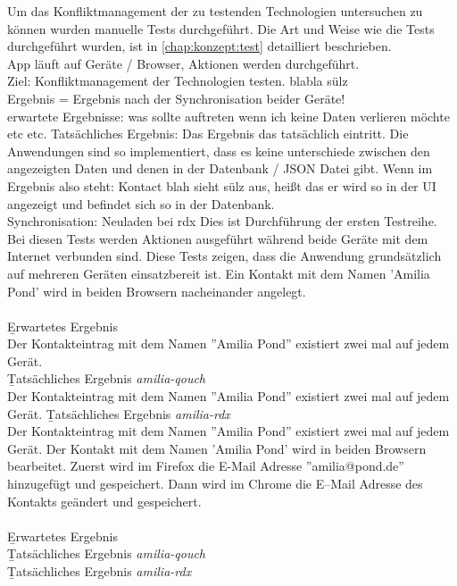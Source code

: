 Um das Konfliktmanagement der zu testenden Technologien untersuchen zu können wurden manuelle Tests durchgeführt.
Die Art und Weise wie die Tests durchgeführt wurden, ist in \autoref{chap:konzept:test} detailliert beschrieben.\\
App läuft auf Geräte / Browser, Aktionen werden durchgeführt.\\
Ziel: Konfliktmanagement der Technologien testen. blabla sülz\\
Ergebnis = Ergebnis nach der Synchronisation beider Geräte!\\ 
erwartete Ergebnisse: was sollte auftreten wenn ich keine Daten verlieren möchte etc etc.
Tatsächliches Ergebnis: Das Ergebnis das tatsächlich eintritt.
Die Anwendungen sind so implementiert, dass es keine unterschiede zwischen den angezeigten Daten und denen in der Datenbank / JSON Datei gibt.
Wenn im Ergebnis also steht: Kontact blah sieht sülz aus, heißt das er wird so in der UI angezeigt und befindet sich so in der Datenbank.\\
Synchronisation: Neuladen bei rdx
% 
% 
% 
Dies ist Durchführung der ersten Testreihe.
Bei diesen Tests werden Aktionen ausgeführt während beide Geräte mit dem Internet verbunden sind.
Diese Tests zeigen, dass die Anwendung grundsätzlich auf mehreren Geräten einsatzbereit ist.
%
Ein Kontakt mit dem Namen 'Amilia Pond' wird in beiden Browsern nacheinander angelegt.\\\\
\b{Erwartetes Ergebnis}\\
Der Kontakteintrag mit dem Namen ''Amilia Pond'' existiert zwei mal auf jedem Gerät.\\
\b{Tatsächliches Ergebnis \it{amilia-qouch}}\\
Der Kontakteintrag mit dem Namen ''Amilia Pond'' existiert zwei mal auf jedem Gerät.
\b{Tatsächliches Ergebnis \it{amilia-rdx}}\\
Der Kontakteintrag mit dem Namen ''Amilia Pond'' existiert zwei mal auf jedem Gerät.
%
Der Kontakt mit dem Namen 'Amilia Pond' wird in beiden Browsern bearbeitet. Zuerst wird im Firefox die E-Mail Adresse ''amilia@pond.de'' hinzugefügt und gespeichert.
Dann wird im Chrome die E--Mail Adresse des Kontakts geändert und gespeichert.\\\\
\b{Erwartetes Ergebnis}\\
\b{Tatsächliches Ergebnis \it{amilia-qouch}}\\
\b{Tatsächliches Ergebnis \it{amilia-rdx}}\\
